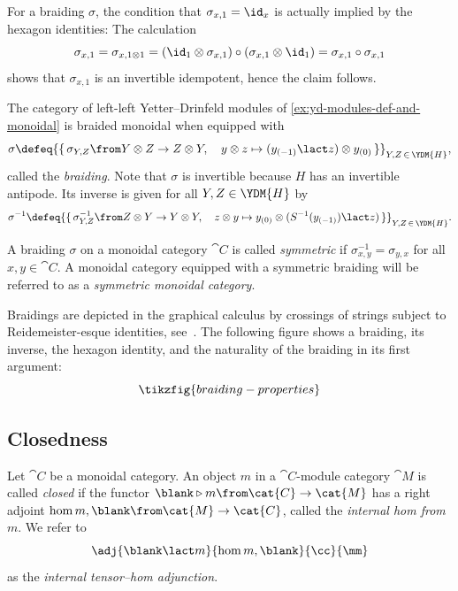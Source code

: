 \begin{remark}\label{rem: braiding_compatibility_with unit}
  For a braiding \(\sigma\), the condition that \(\sigma_{x,1} = \id_x\) is actually implied by the hexagon identities:
  The calculation
  \[
    \sigma_{x,1} = \sigma_{x, 1\otimes 1} = (\id_1 \otimes \sigma_{x,1}) \circ (\sigma_{x,1} \otimes \id_1) = \sigma_{x,1} \circ \sigma_{x,1}
  \]
  shows that \(\sigma_{x,1}\) is an invertible idempotent,
  hence the claim follows.
\end{remark}

\begin{example}\label{ex:yd-modules-are-braided}
  The category of left-left Yetter–Drinfeld modules of \cref{ex:yd-modules-def-and-monoidal}
  is braided monoidal when equipped with
  \[
    \sigma \defeq {\{\, \sigma_{Y,Z} \from Y \otimes Z \to Z \otimes Y, \quad y \otimes z \mapsto (y_{(-1)} \lact z) \otimes y_{(0)} \,\}}_{Y,Z \,\in\, \YDM{H}},
  \]
  called the \emph{\YetterDrinfeld{} braiding}.
  Note that \(\sigma\) is invertible because
  \(H\) has an invertible antipode.
  Its inverse is given for all \(Y, Z \in \YDM{H}\) by
  \[
    \sigma^{-1} \defeq {\{\, \sigma^{-1}_{Y,Z} \from Z \otimes Y \to Y \otimes Y, \quad z \otimes y \mapsto y_{(0)} \otimes (S^{-1}(y_{(-1)}) \lact z) \,\}}_{Y,Z \,\in\, \YDM{H}}.
  \]
\end{example}

\begin{definition}\label{def:symmetric-braiding}
  A braiding \(\sigma\) on a monoidal category \(\cat{C}\) is called \emph{symmetric} if \(\sigma_{x,y}^{-1} = \sigma_{y,x}\) for all \(x, y \in \cat{C}\).
  A monoidal category equipped with a symmetric braiding will be referred to as a \emph{symmetric monoidal category}.
\end{definition}

Braidings are depicted in the graphical calculus by crossings of strings subject to Reidemeister\hyp{}esque identities, see~\cite{Selinger2011}.
The following figure shows a braiding, its inverse, the hexagon identity, and the naturality of the braiding in its first argument:
\[
  \tikzfig{braiding-properties}
\]

\subsection{Closedness}\label{sec:closed-mon-cats}

\begin{definition}\label{def:closed-module-category}
  Let \(\cat{C}\) be a monoidal category.
  An object \(m\) in a \(\cat{C}\)\hyp{}module category \(\cat{M}\) is called \emph{closed}
  if the functor \(\blank \triangleright m\from \cat{C} \to \cat{M}\) has a right adjoint
  \(\hom{m, \blank}\from \cat{M}\to \cat{C}\), called the \emph{internal hom from \(m\)}.
  We refer to
  \[
    \adj{\blank \lact m}{\hom{m, \blank}}{\cc}{\mm}
  \]
  as the \emph{internal tensor--hom adjunction}.
\end{definition}

